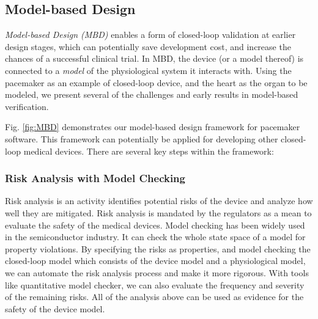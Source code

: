 \subsection{Model-based Design}
\emph{Model-based Design (MBD)} enables a form of closed-loop validation at earlier design stages, which can potentially save development cost, and increase the chances of a successful clinical trial.
In MBD, the device (or a model thereof) is connected to a \emph{model} of the physiological system it interacts with.
Using the pacemaker as an example of closed-loop device, and the heart as the organ to be modeled, we present several of the challenges and early results in model-based verification.

Fig. \ref{fig:MBD} demonstrates our model-based design framework for pacemaker software.
This framework can potentially be applied for developing other closed-loop medical devices.
There are several key steps within the framework:
\subsubsection{Risk Analysis with Model Checking}
Risk analysis is an activity identifies potential risks of the device and analyze how well they are mitigated.
Risk analysis is mandated by the regulators as a mean to evaluate the safety of the medical devices.
Model checking has been widely used in the semiconductor industry.
It can check the whole state space of a model for property violations.
By specifying the risks as properties, and model checking the closed-loop model which consists of the device model and a physiological model, we can automate the risk analysis process and make it more rigorous.
With tools like quantitative model checker, we can also evaluate the frequency and severity of the remaining risks.
All of the analysis above can be used as evidence for the safety of the device model.


